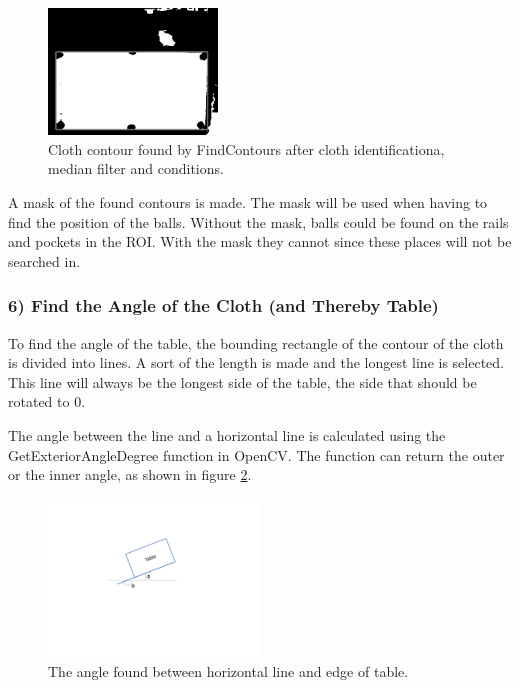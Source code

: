 \begin{figure}[H]
\begin{center}
\leavevmode
\includegraphics[width=0.4\textwidth]{images/clothcontour}
\end{center}
\caption{Cloth contour found by FindContours after cloth identificationa, median filter and conditions.}
\label{fig:clothcontour}
\end{figure}

A mask of the found contours is made. The mask will be used when having to find the position of the balls. Without the mask, balls could be found on the rails and pockets in the ROI. With the mask they cannot since these places will not be searched in.


\subsubsection{6) Find the Angle of the Cloth (and Thereby Table)}
To find the angle of the table, the bounding rectangle of the contour of the cloth is divided into lines. A sort of the length is made and the longest line is selected. This line will always be the longest side of the table, the side that should be rotated to 0\degree.

The angle between the line and a horizontal line is calculated using the GetExteriorAngleDegree function in OpenCV. The function can return the outer or the inner angle, as shown in figure \ref{fig:table_angle}.
\begin{figure}[htpb]
\begin{center}
\leavevmode
\includegraphics[width=0.5\textwidth]{images/table_angle}
\end{center}
\caption{The angle found between horizontal line and edge of table.}
\label{fig:table_angle}
\end{figure}

